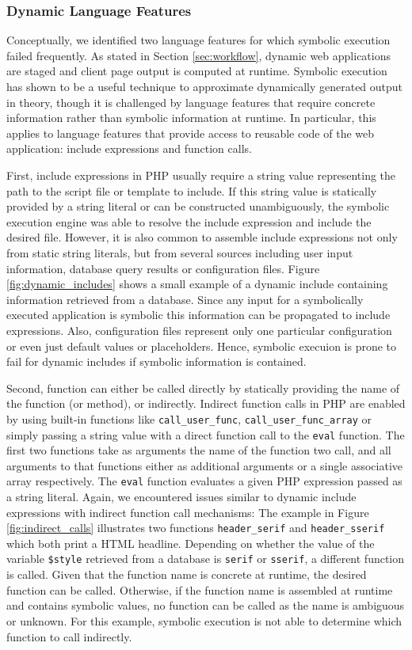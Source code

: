 \documentclass[sigconf]{acmart}
\renewcommand{\tt}[1]{\texttt{#1}}
\begin{document}
\subsubsection{Dynamic Language Features}
Conceptually, we identified two language features for which symbolic execution
failed frequently. As stated in Section \ref{sec:workflow}, dynamic web
applications are staged and client page output is computed at runtime. Symbolic
execution has shown to be a useful technique to approximate dynamically
generated output in theory, though it is challenged by language features that
require concrete information rather than symbolic information at runtime. In particular, this
applies to language features that provide access to reusable code of the web
application: include expressions and function calls.

First, include expressions in PHP usually require a string value representing
the path to the script file or template to include. If this string value is
statically provided by a string literal or can be constructed unambiguously, the
symbolic execution engine was able to resolve the include expression and include
the desired file. However, it is also common to assemble include expressions not
only from static string literals, but from several sources including user input
information, database query results or configuration files. Figure
\ref{fig:dynamic_includes} shows a small example of a dynamic include containing
information retrieved from a database. Since any input for a symbolically
executed application is symbolic this information can be propagated to include
expressions. Also, configuration files represent only one particular
configuration or even just default values or placeholders. Hence, symbolic
execuion is prone to fail for dynamic includes if symbolic information is contained.

Second, function can either be called directly by statically providing the name
of the function (or method), or indirectly. Indirect function calls in PHP are
enabled by using built-in functions like \tt{call\_user\_func},
\tt{call\_user\_func\_array} or simply passing a string value with a direct
function call to the \tt{eval} function. The first two functions take as
arguments the name of the function two call, and all arguments to that
functions either as additional arguments or a single associative array
respectively.
The \tt{eval} function evaluates a given PHP expression passed as a string
literal.
Again, we encountered issues similar to dynamic include expressions with
indirect function call mechanisms: The example in Figure
\ref{fig:indirect_calls} illustrates two functions \tt{header\_serif} and
\tt{header\_sserif} which both print a HTML headline. Depending on whether the
value of the variable \tt{\$style} retrieved from a database is \tt{serif} or
\tt{sserif}, a different function is called. Given that the function name is 
concrete at runtime, the desired function can be called. Otherwise, if the
function name is assembled at runtime and contains symbolic values, no function
can be called as the name is ambiguous or unknown. For this example, symbolic
execution is not able to determine which function to call indirectly.
\end{document}
